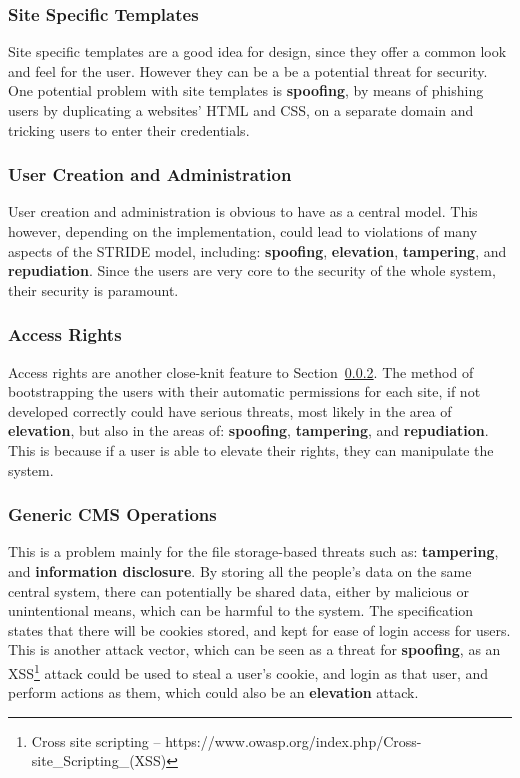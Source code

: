 \documentclass{article}
\numberwithin{equation}{section} %
\numberwithin{figure}{section} %
\numberwithin{table}{section} %
\begin{document}
\subsubsection{Site Specific Templates}
Site specific templates are a good idea for design, since they offer a common look and feel for the user.  However they can be a be a potential threat for security. One potential problem with site templates is \textbf{spoofing}, by means of phishing users by duplicating a websites' HTML and CSS, on a separate domain and tricking users to enter their credentials.

\subsubsection{User Creation and Administration}
\label{sec:user}
User creation and administration is obvious to have as a central model.  This however, depending on the implementation, could lead to violations of many aspects of the STRIDE model, including: \textbf{spoofing}, \textbf{elevation}, \textbf{tampering}, and \textbf{repudiation}.  Since the users are very core to the security of the whole system, their security is paramount. 

\subsubsection{Access Rights}
\label{sec:access}
Access rights are another close-knit feature to Section~\ref{sec:user}.  The method of bootstrapping the users with their automatic permissions for each site, if not developed correctly could have serious threats, most likely in the area of \textbf{elevation}, but also in the areas of: \textbf{spoofing}, \textbf{tampering}, and \textbf{repudiation}.  This is because if a user is able to elevate their rights, they can manipulate the system.

\subsubsection{Generic CMS Operations}
\label{sec:cms}
This is a problem mainly for the file storage-based threats such as: \textbf{tampering}, and \textbf{information disclosure}.  By storing all the people's data on the same central system, there can potentially be shared data, either by malicious or unintentional means, which can be harmful to the system.  The specification states that there will be cookies stored, and kept for ease of login access for users.\cite{spec} This is another attack vector, which can be seen as a threat for \textbf{spoofing}, as an XSS\footnote{Cross site scripting -- https://www.owasp.org/index.php/Cross-site\_Scripting\_(XSS)} attack could be used to steal a user's cookie, and login as that user, and perform actions as them, which could also be an \textbf{elevation} attack.
\end{document}
